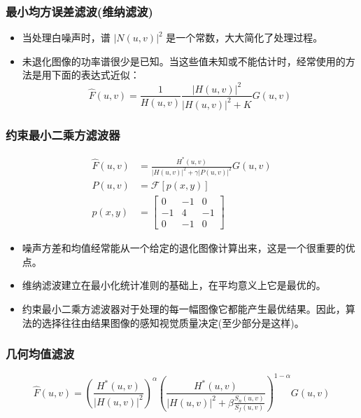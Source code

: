 \documentclass{beamer}
\begin{document}
\begin{frame}
\frametitle{最小均方误差滤波(维纳滤波)}
\label{sec-9-14}


\begin{itemize}
\item 当处理白噪声时，谱 $|N(u,v)|^2$ 是一个常数，大大简化了处理过程。
\item 未退化图像的功率谱很少是已知。当这些值未知或不能估计时，经常使用的方法是用下面的表达式近似：
   \[ \hat F(u,v) = \frac{1}{H(u,v)}\frac{|H(u,v)|^2 }{|H(u,v)|^2+K}G(u,v) \]
\end{itemize}
\end{frame}
\begin{frame}
\frametitle{约束最小二乘方滤波器}
\label{sec-9-15}


\begin{align*}
\hat F(u,v) &= \frac{H^{* }(u,v) }{|H(u,v)|^2+\gamma|P(u,v)|^2}G(u,v)\\
P(u,v)&=\mathcal{F}[p(x,y)]\\
p(x,y)&=
\begin{bmatrix}
0 & -1 & 0 \\
-1 & 4 & -1 \\
0 & -1 & 0 
\end{bmatrix}
\end{align*}
\begin{itemize}
\item 噪声方差和均值经常能从一个给定的退化图像计算出来，这是一个很重要的优点。
\item 维纳滤波建立在最小化统计准则的基础上，在平均意义上它是最优的。
\item 约束最小二乘方滤波器对于处理的每一幅图像它都能产生最优结果。因此，算法的选择往往由结果图像的感知视觉质量决定(至少部分是这样)。
\end{itemize}
\end{frame}
\begin{frame}
\frametitle{几何均值滤波}
\label{sec-9-16}

\[ \hat F(u,v) =\left(\frac{H^{*}(u,v)}{|H(u,v)|^2}\right)^{\alpha}\left(\frac{H^{ *}(u,v)}{|H(u,v)|^2+\beta \frac{S_n(u,v)}{S_f(u,v)}}\right)^{1-\alpha}G(u,v) \]
\end{frame}
\end{document}
